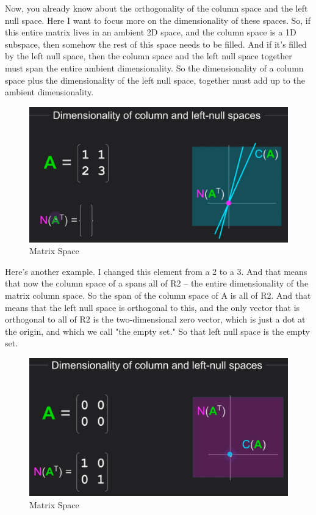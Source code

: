 \documentclass[fleqn,10pt]{olplainarticle}
\theoremstyle{definition}
\theoremstyle{remark}
\begin{document}
Now, you already know about the orthogonality of the column space and the left null space. Here I want to focus more on the dimensionality of these spaces. So, if this entire matrix lives in an ambient 2D space, and the column space is a 1D subspace, then somehow the rest of this space needs to be filled. And if it's filled by the left null space, then the column space and the left null space together must span the entire ambient dimensionality. So the dimensionality of a column space plus the dimensionality of the left null space, together must add up to the ambient dimensionality.

\begin{figure}[ht]
	\centering
	\includegraphics[width=0.6\linewidth]{images/matrix-space-33.png}
	\caption{Matrix Space}
	\label{fig:matrix_space_33}
\end{figure}

Here's another example. I changed this element from a 2 to a 3. And that means that now the column space of a spans all of R2 -- the entire dimensionality of the matrix column space. So the span of the column space of A is all of R2. And that means that the left null space is orthogonal to this, and the only vector that is orthogonal to all of R2 is the two-dimensional zero vector, which is just a dot at the origin, and which we call "the empty set." So that left null space is the empty set.

\begin{figure}[ht]
	\centering
	\includegraphics[width=0.6\linewidth]{images/matrix-space-34.png}
	\caption{Matrix Space}
	\label{fig:matrix_space_34}
\end{figure}
\end{document}
